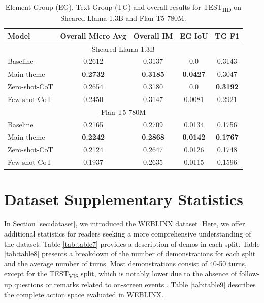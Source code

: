 \documentclass[11pt]{article}
\begin{document}
\clearpage
\begin{table}[h]
\centering
\caption{Element Group (EG), Text Group (TG) and overall results for TEST\textsubscript{IID} on Sheared-Llama-1.3B and Flan-T5-780M.}
\label{table:performance_test_iid}
\begin{tabular}{|l|c|c|c|c|}
\hline
\textbf{Model} & \textbf{Overall Micro Avg} & \textbf{Overall IM} & \textbf{EG IoU} & \textbf{TG F1} \\
\hline\multicolumn{5}{|c|}{Sheared-Llama-1.3B}\\
\hline
Baseline & 0.2612 & 0.3137 & 0.0 & 0.3143 \\
\hline
Main theme & \textbf{0.2732} & \textbf{0.3185} & \textbf{0.0427} & 0.3047 \\
\hline
Zero-shot-CoT & 0.2654 & 0.3180 & 0.0 & \textbf{0.3192} \\
\hline
Few-shot-CoT & 0.2450 & 0.3147 & 0.0081 & 0.2921 \\
\hline\multicolumn{5}{|c|}{Flan-T5-780M}\\
\hline
Baseline & 0.2165 & 0.2709 & 0.0134 & 0.1756 \\
\hline
Main theme & \textbf{0.2242} & \textbf{0.2868} & \textbf{0.0142} & \textbf{0.1767} \\
\hline
Zero-shot-CoT & 0.2124 & 0.2647 & 0.0126 & 0.1748 \\
\hline
Few-shot-CoT & 0.1937 & 0.2635 & 0.0115 & 0.1596 \\
\hline
\end{tabular}
\end{table}


\section{Dataset Supplementary Statistics}

In Section \ref{sec:dataset}, we introduced the WEBLINX dataset. Here, we offer additional statistics for readers seeking a more comprehensive understanding of the dataset. Table \ref{tab:table7} provides a description of demos in each split. Table \ref{tab:table8} presents a breakdown of the number of demonstrations for each split and the average number of turns. Most demonstrations consist of 40-50 turns, except for the TEST\textsubscript{VIS} split, which is notably lower due to the absence of follow-up questions or remarks related to on-screen events \cite{lxinghan_2024_weblinx}. Table \ref{tab:table9} describes the complete action space evaluated in WEBLINX.
\end{document}
